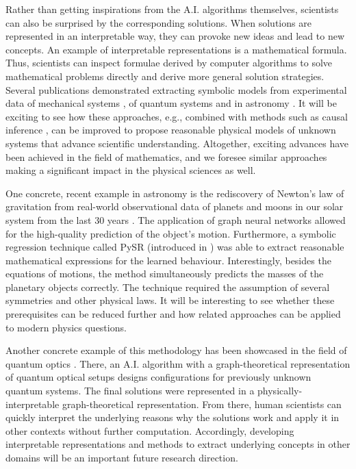  Rather than getting inspirations from the A.I. algorithms themselves, scientists can also be surprised by the corresponding solutions. When solutions are represented in an interpretable way, they can provoke new ideas and lead to new concepts. An example of interpretable representations is a mathematical formula. Thus, scientists can inspect formulae derived by computer algorithms to solve mathematical problems directly and derive more general solution strategies. Several publications demonstrated extracting symbolic models from experimental data of mechanical systems \cite{schmidt2009distilling, udrescu2020ai}, of quantum systems \cite{gentile2021learning} and in astronomy \cite{cranmer2020discovering}. It will be exciting to see how these approaches, e.g., combined with methods such as causal inference \cite{cranmer2020frontier}, can be improved to propose reasonable physical models of unknown systems that advance scientific understanding. Altogether, exciting advances have been achieved in the field of mathematics\cite{raayoni2021generating,wagner2021constructions}, and we foresee similar approaches making a significant impact in the physical sciences as well.

One concrete, recent example in astronomy is the rediscovery of Newton's law of gravitation from real-world observational data of planets and moons in our solar system from the last 30 years \cite{lemos2022rediscovering}. The application of graph neural networks allowed for the high-quality prediction of the object's motion. Furthermore, a symbolic regression technique called PySR (introduced in \cite{cranmer2020discovering}) was able to extract reasonable mathematical expressions for the learned behaviour. Interestingly, besides the equations of motions, the method simultaneously predicts the masses of the planetary objects correctly. The technique required the assumption of several symmetries and other physical laws. It will be interesting to see whether these prerequisites can be reduced further and how related approaches can be applied to modern physics questions.

Another concrete example of this methodology has been showcased in the field of quantum optics \cite{krenn2020conceptual}. There, an A.I. algorithm with a graph-theoretical representation of quantum optical setups designs configurations for previously unknown quantum systems. The final solutions were represented in a physically-interpretable graph-theoretical representation. From there, human scientists can quickly interpret the underlying reasons why the solutions work and apply it in other contexts without further computation. Accordingly, developing interpretable representations and methods to extract underlying concepts in other domains will be an important future research direction.


